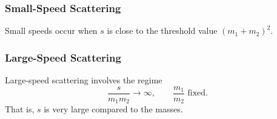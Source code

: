 \subsubsection{Small-Speed Scattering}
Small speeds occur when $s$ is close to the threshold value $(m_{1} + m_{2})^{2}$.
\subsubsection{Large-Speed Scattering}
Large-speed scattering involves the regime
\begin{equation}
	\frac{s}{m_{1} m_{2}} \rightarrow \infty, \qquad \frac{m_{1}}{m_{2}} \text{ fixed}.
\end{equation}
That is, $s$ is very large compared to the masses.
